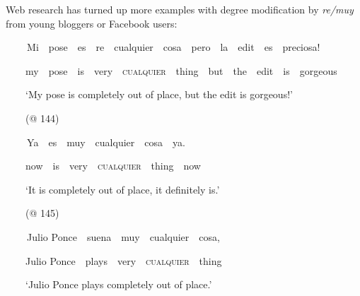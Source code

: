 \begin{styleStandard}
Web research has turned up more examples with degree modification by \textit{re/muy} from young bloggers or Facebook users:
\end{styleStandard}

\begin{styleStandard}
\textbf{\ \ }\ \ Mi\ \ pose\ \ es\ \ re\ \ cualquier\ \ cosa\ \ pero\ \ la\ \ edit\ \ es\ \ preciosa!
\end{styleStandard}

\begin{styleStandard}
\ \ \ \ my\ \ pose\ \ is\ \ very\ \ \textsc{cualquier}\ \ thing\ \ but\ \ the\ \ edit\ \ is\ \ gorgeous
\end{styleStandard}

\begin{styleStandard}
\ \ \ \ ‘My pose is completely out of place, but the edit is gorgeous!’
\end{styleStandard}

\begin{styleStandard}
\ \ \ \ (@ 144)
\end{styleStandard}

\begin{styleStandard}
\textbf{\ \ }\ \ Ya\ \ es\ \ muy\ \ cualquier\ \ cosa\ \ ya.
\end{styleStandard}

\begin{styleStandard}
\ \ \ \ now\ \ is\ \ very\ \ \textsc{cualquier}\ \ thing\ \ now
\end{styleStandard}

\begin{styleStandard}
\ \ \ \ ‘It is completely out of place, it definitely is.’
\end{styleStandard}

\begin{styleStandard}
\ \ \ \ (@ 145)
\end{styleStandard}

\begin{styleStandard}
\textbf{\ \ }\ \ Julio Ponce\ \ suena\ \ muy\ \ cualquier\ \ cosa,
\end{styleStandard}

\begin{styleStandard}
\ \ \ \ Julio Ponce\ \ plays\ \ very\ \ \textsc{cualquier}\ \ thing
\end{styleStandard}

\begin{styleStandard}
\ \ \ \ ‘Julio Ponce plays completely out of place.’
\end{styleStandard}

